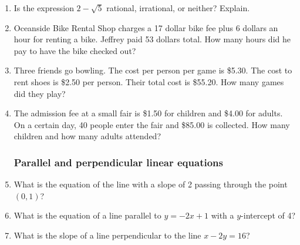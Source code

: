 \documentclass[12pt, oneside]{article}
\begin{document}
\begin{enumerate}
  \item Is the expression $2-\sqrt{5}$ rational, irrational, or neither? Explain.

\newpage
  \item Oceanside Bike Rental Shop charges a 17 dollar bike fee plus 6 dollars an hour for renting a bike. Jeffrey paid 53 dollars total. How many hours did he pay to have the bike checked out? \vspace{6cm}

  \item Three friends go bowling. The cost per person per game is \$5.30. The cost to rent shoes is \$2.50 per person. Their total cost is \$55.20. How many games did they play? \vspace{6cm}

  \item The admission fee at a small fair is \$1.50 for children and \$4.00 for adults. On a certain day, 40 people enter the fair and \$85.00 is collected. How many children and how many adults attended?

\newpage
\subsubsection*{Parallel and perpendicular linear equations}

  \item What is the equation of the line with a slope of 2 passing through the point $(0,1)$? \vspace{4cm}
  \item What is the equation of a line parallel to $y=-2x+1$ with a $y$-intercept of 4? \vspace{4cm}
  \item What is the slope of a line perpendicular to the line $x-2y=16$? \vspace{4cm}

\end{enumerate}
\end{document}

